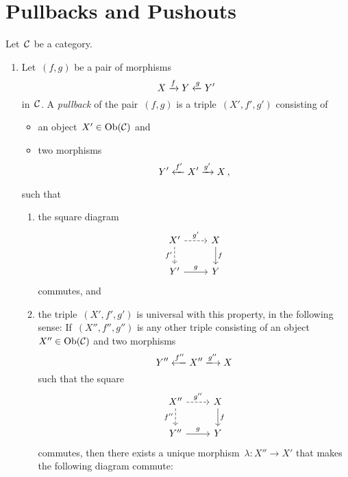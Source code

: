 \section{Pullbacks and Pushouts}


\begin{definition*}
  Let~$\mathcal{C}$ be a category.
  \begin{enumerate}
    \item
      Let~$(f,g)$ be a pair of morphisms
      \[
        X \xrightarrow{f} Y \xleftarrow{g} Y'
      \]
      in~$\mathcal{C}$.
      A \emph{pullback} of the pair~$(f,g)$ is a triple~$(X', f', g')$ consisting of
      \begin{itemize}
        \item
          an object~$X' \in \operatorname{Ob}(\mathcal{C})$ and
        \item
          two morphisms \[Y' \xleftarrow{f'} X' \xrightarrow{g'} X \,,\]
      \end{itemize}
      such that
      \begin{enumerate}[label=(PB\arabic*)]
        \item
          the square diagram
          \[
            \begin{tikzcd}
                X'
                \arrow[dashed]{r}[above]{g'}
                \arrow[dashed]{d}[left]{f'}
              & X
                \arrow{d}[right]{f}
              \\
                Y'
                \arrow{r}[above]{g}
              & Y
            \end{tikzcd}
          \]
          commutes, and
        \item
          the triple~$(X', f', g')$ is universal with this property, in the following sense:
          If~$(X'', f'', g'')$ is any other triple consisting of an object~$X'' \in \operatorname{Ob}(\mathcal{C})$ and two morphisms
          \[
            Y'' \xlongfrom{f''} X'' \xlongto{g''} X
          \]
          such that the square
          \[
            \begin{tikzcd}
                X''
                \arrow[dashed]{r}[above]{g''}
                \arrow[dashed]{d}[left]{f''}
              & X
                \arrow{d}[right]{f}
              \\
                Y''
                \arrow{r}[above]{g}
              & Y
            \end{tikzcd}
          \]
          commutes, then there exists a unique morphism~$\lambda \colon X'' \to X'$ that makes the following diagram commute:
          \[
            \begin{tikzcd}

\end{tikzcd}\]
\end{enumerate}
\end{enumerate}
\end{definition*}
